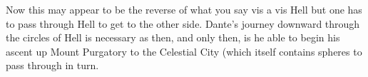 \begin{footnotesize}
\begin{sffamily}
Now this may appear to be the reverse of what you say vis a vis Hell but one has to pass through Hell to get to the other side. Dante's journey downward through the circles of Hell is necessary as then, and only then, is he able to begin his ascent up Mount Purgatory to the Celestial City (which itself contains spheres to pass through in turn.

\end{sffamily}
\end{footnotesize}


